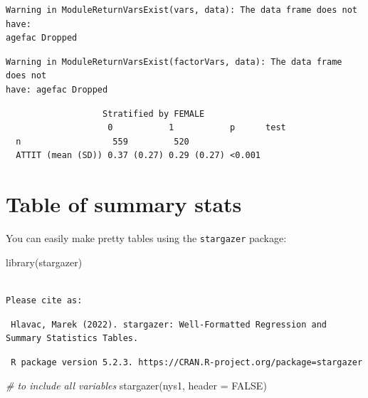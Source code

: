 \documentclass[
  letterpaper,
  DIV=11,
  numbers=noendperiod]{scrreprt}
\newenvironment{Shaded}{\begin{snugshade}}{\end{snugshade}}
\newcommand{\AttributeTok}[1]{\textcolor[rgb]{0.49,0.56,0.16}{#1}}
\newcommand{\CommentTok}[1]{\textcolor[rgb]{0.38,0.63,0.69}{\textit{#1}}}
\newcommand{\ConstantTok}[1]{\textcolor[rgb]{0.53,0.00,0.00}{#1}}
\newcommand{\FunctionTok}[1]{\textcolor[rgb]{0.02,0.16,0.49}{#1}}
\newcommand{\NormalTok}[1]{\textcolor[rgb]{0.00,0.44,0.13}{#1}}
\begin{document}
\begin{verbatim}
Warning in ModuleReturnVarsExist(vars, data): The data frame does not have:
agefac Dropped
\end{verbatim}

\begin{verbatim}
Warning in ModuleReturnVarsExist(factorVars, data): The data frame does not
have: agefac Dropped
\end{verbatim}

\begin{verbatim}
                   Stratified by FEMALE
                    0           1           p      test
  n                  559         520                   
  ATTIT (mean (SD)) 0.37 (0.27) 0.29 (0.27) <0.001     
\end{verbatim}

\hypertarget{table-of-summary-stats-1}{%
\section{Table of summary stats}\label{table-of-summary-stats-1}}

You can easily make pretty tables using the \texttt{stargazer} package:

\begin{Shaded}
\begin{Highlighting}[]
  \FunctionTok{library}\NormalTok{(stargazer)}
\end{Highlighting}
\end{Shaded}

\begin{verbatim}

Please cite as: 
\end{verbatim}

\begin{verbatim}
 Hlavac, Marek (2022). stargazer: Well-Formatted Regression and Summary Statistics Tables.
\end{verbatim}

\begin{verbatim}
 R package version 5.2.3. https://CRAN.R-project.org/package=stargazer 
\end{verbatim}

\begin{Shaded}
\begin{Highlighting}[]
\CommentTok{\# to include all variables}
  \FunctionTok{stargazer}\NormalTok{(nys1, }\AttributeTok{header =} \ConstantTok{FALSE}\NormalTok{)}
\end{Highlighting}
\end{Shaded}
\end{document}
